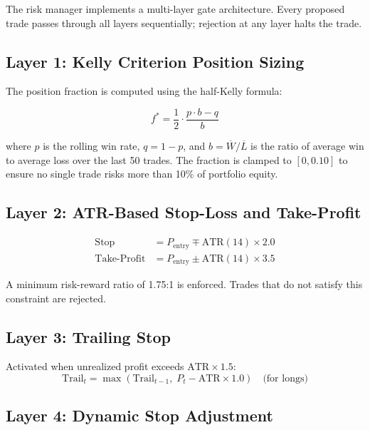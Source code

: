 \documentclass[12pt,a4paper]{article}
\begin{document}
The risk manager implements a multi-layer gate architecture. Every proposed trade passes through all layers sequentially; rejection at any layer halts the trade.

\subsection{Layer 1: Kelly Criterion Position Sizing}

The position fraction is computed using the half-Kelly formula:

\begin{equation}
    f^* = \frac{1}{2} \cdot \frac{p \cdot b - q}{b}
\end{equation}

where $p$ is the rolling win rate, $q = 1-p$, and $b = \overline{W}/\overline{L}$ is the ratio of average win to average loss over the last 50 trades. The fraction is clamped to $[0, 0.10]$ to ensure no single trade risks more than 10\% of portfolio equity.

\subsection{Layer 2: ATR-Based Stop-Loss and Take-Profit}

\begin{align}
    \text{Stop} &= P_{\text{entry}} \mp \text{ATR}(14) \times 2.0 \\
    \text{Take-Profit} &= P_{\text{entry}} \pm \text{ATR}(14) \times 3.5
\end{align}

A minimum risk-reward ratio of 1.75:1 is enforced. Trades that do not satisfy this constraint are rejected.

\subsection{Layer 3: Trailing Stop}

Activated when unrealized profit exceeds $\text{ATR} \times 1.5$:
\begin{equation}
    \text{Trail}_{t} = \max\!\left(\text{Trail}_{t-1},\; P_{t} - \text{ATR} \times 1.0\right) \quad \text{(for longs)}
\end{equation}

\subsection{Layer 4: Dynamic Stop Adjustment}
\end{document}
